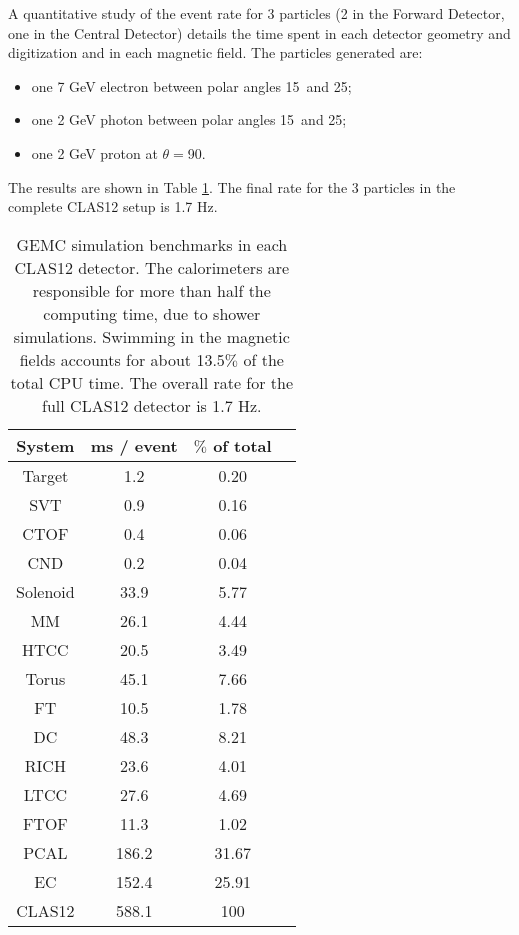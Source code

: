 A quantitative study of the event rate for 3 particles (2 in the Forward Detector, one in the Central Detector)
details the time spent in each detector geometry and digitization and in each magnetic field.
The particles generated are:

\begin{itemize}
	\item one 7 GeV electron between polar angles 15\mdeg \ and 25\mdeg;
	\item one 2 GeV photon between polar angles 15\mdeg \ and 25\mdeg;
	\item one 2 GeV proton at $\theta=$90\mdeg.
\end{itemize}

The results are shown in Table \ref{tab:benchmarks}. The final rate for the 3 particles in the
complete CLAS12 setup is 1.7 Hz.

\begin{table}[h]
	\begin{center}
		\begin{tabular}{ c | c | c | c }
			 \hline \hline
System	 & ms / event &  $\%$ of total\\
			\hline
Target   &  1.2   & 0.20  \\
SVT      &  0.9   & 0.16  \\
CTOF     &  0.4   & 0.06  \\
CND      &  0.2   & 0.04  \\
Solenoid &  33.9  & 5.77  \\
MM       &  26.1  & 4.44  \\
HTCC     &  20.5  & 3.49  \\
Torus    &  45.1  & 7.66  \\
FT       &  10.5  & 1.78  \\
DC       &  48.3  & 8.21  \\
RICH     &  23.6  & 4.01  \\
LTCC     &  27.6  & 4.69  \\
FTOF     &  11.3  & 1.02  \\
PCAL     &  186.2 & 31.67 \\
EC       &  152.4 & 25.91 \\
		\hline
CLAS12   &  588.1 & 100 \\
		\hline \hline
		\end{tabular}
	\end{center}
	\caption{GEMC simulation benchmarks in each CLAS12 detector. The calorimeters are responsible for more than
             half the computing time, due to shower simulations. Swimming in the magnetic fields accounts for about 13.5$\%$ of the total CPU time.
			 The overall rate for the full CLAS12 detector is 1.7 Hz.
}
\label{tab:benchmarks}
\end{table}


